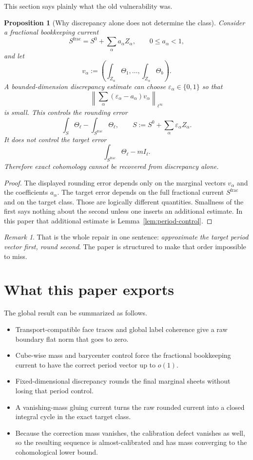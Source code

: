 \documentclass[11pt]{article}
\numberwithin{equation}{section}
\theoremstyle{plain}
\newtheorem{proposition}[theorem]{Proposition}
\theoremstyle{definition}
\theoremstyle{remark}
\newtheorem{remark}[theorem]{Remark}
\begin{document}
This section says plainly what the old vulnerability was.

\begin{proposition}[Why discrepancy alone does not determine the class]\label{prop:why-repair}
Consider a fractional bookkeeping current
\[
S^{\mathrm{frac}}=S^0+\sum_{\alpha} a_\alpha Z_\alpha,
\qquad 0\le a_\alpha<1,
\]
and let
\[
v_\alpha:=\left(\int_{Z_\alpha}\Theta_1,\dots,\int_{Z_\alpha}\Theta_b\right).
\]
A bounded-dimension discrepancy estimate can choose $\varepsilon_\alpha\in\{0,1\}$ so that
\[
\left\|\sum_\alpha (\varepsilon_\alpha-a_\alpha)v_\alpha\right\|_{\ell^\infty}
\]
is small.  This controls the rounding error
\[
\int_{S}\Theta_\ell-\int_{S^{\mathrm{frac}}}\Theta_\ell,
\qquad
S:=S^0+\sum_\alpha \varepsilon_\alpha Z_\alpha.
\]
It does \emph{not} control the target error
\[
\int_{S^{\mathrm{frac}}}\Theta_\ell-mI_\ell.
\]
Therefore exact cohomology cannot be recovered from discrepancy alone.
\end{proposition}

\begin{proof}
The displayed rounding error depends only on the marginal vectors $v_\alpha$ and the coefficients $a_\alpha$.  The target error depends on the full fractional current $S^{\mathrm{frac}}$ and on the target class.  Those are logically different quantities.  Smallness of the first says nothing about the second unless one inserts an additional estimate.  In this paper that additional estimate is Lemma~\ref{lem:period-control}.
\end{proof}

\begin{remark}
That is the whole repair in one sentence: \emph{approximate the target period vector first, round second}.  The paper is structured to make that order impossible to miss.
\end{remark}

\section{What this paper exports}\label{sec:exports}

The global result can be summarized as follows.

\begin{itemize}
\item Transport-compatible face traces and global label coherence give a raw boundary flat norm that goes to zero.
\item Cube-wise mass and barycenter control force the fractional bookkeeping current to have the correct period vector up to $o(1)$.
\item Fixed-dimensional discrepancy rounds the final marginal sheets without losing that period control.
\item A vanishing-mass gluing current turns the raw rounded current into a closed integral cycle in the exact target class.
\item Because the correction mass vanishes, the calibration defect vanishes as well, so the resulting sequence is almost-calibrated and has mass converging to the cohomological lower bound.
\end{itemize}
\end{document}
